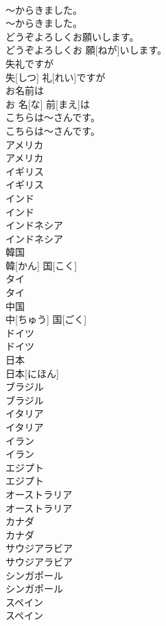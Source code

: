 \documentclass[8pt]{extreport}
\begin{document}
\begin{CJK}{UTF8}{min}
\\	～からきました。	
\\	～からきました。		
\\	どうぞよろしくお願いします。	
\\	どうぞよろしくお 願[ねが]いします。		
\\	失礼ですが	
\\	失[しつ] 礼[れい]ですが		
\\	お名前は	
\\	お 名[な] 前[まえ]は		
\\	こちらは～さんです。	
\\	こちらは～さんです。		
\\	アメリカ	
\\	アメリカ		
\\	イギリス	
\\	イギリス		
\\	インド	
\\	インド		
\\	インドネシア	
\\	インドネシア		
\\	韓国	
\\	韓[かん] 国[こく]		
\\	タイ	
\\	タイ		
\\	中国	
\\	中[ちゅう] 国[ごく]		
\\	ドイツ	
\\	ドイツ		
\\	日本	
\\	日本[にほん]		
\\	ブラジル	
\\	ブラジル		
\\	イタリア	
\\	イタリア		
\\	イラン	
\\	イラン		
\\	エジプト	
\\	エジプト		
\\	オーストラリア	
\\	オーストラリア		
\\	カナダ	
\\	カナダ		
\\	サウジアラビア	
\\	サウジアラビア		
\\	シンガポール	
\\	シンガポール		
\\	スペイン	
\\	スペイン		

\end{CJK}
\end{document}
